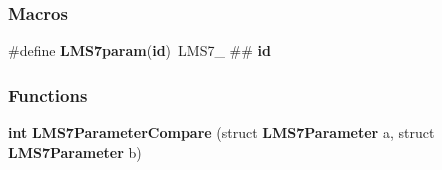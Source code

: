 \subsubsection*{Macros}
\begin{DoxyCompactItemize}
\item 
\#define {\bf L\+M\+S7param}({\bf id})~L\+M\+S7\+\_\+ \#\# {\bf id}
\end{DoxyCompactItemize}
\subsubsection*{Functions}
\begin{DoxyCompactItemize}
\item 
{\bf int} {\bf L\+M\+S7\+Parameter\+Compare} (struct {\bf L\+M\+S7\+Parameter} a, struct {\bf L\+M\+S7\+Parameter} b)
\end{DoxyCompactItemize}
